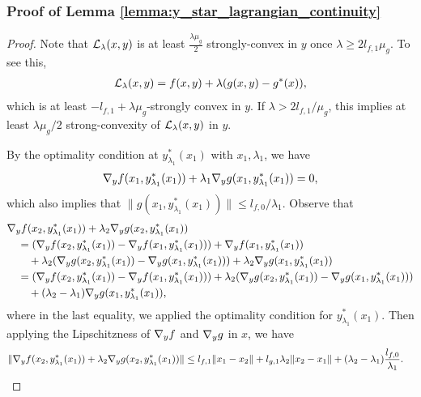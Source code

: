 \subsubsection{Proof of Lemma \ref{lemma:y_star_lagrangian_continuity}}
\begin{proof}
    Note that $\mathcal{L}_{\lambda}(x,y)$ is at least $\frac{\lambda\mu_g}{2}$ strongly-convex in $y$ once $\lambda \ge 2 l_{f,1} \mu_g$. To see this,
    \begin{align*}
        \mathcal{L}_{\lambda}(x,y) = f(x,y) + \lambda (g(x,y) - g^*(x)),
    \end{align*}
    which is at least $-l_{f,1} + \lambda \mu_g$-strongly convex in $y$. If $\lambda > 2l_{f,1} / \mu_g$, this implies at least $\lambda \mu_g / 2$ strong-convexity of $\mathcal{L}_{\lambda} (x,y)$ in $y$. 

    By the optimality condition at $y_{\lambda_1}^*(x_1)$ with $x_1, \lambda_1$, we have
    \begin{align*}
        \nabla_y f(x_1, y_{\lambda_1}^*(x_1) ) + \lambda_1 \nabla_y g(x_1, y_{\lambda_1}^*(x_1) ) = 0,
    \end{align*}
    which also implies that $\|g(x_1, y_{\lambda_1}^*(x_1) )\| \le l_{f,0} / \lambda_1$. Observe that
    \begin{align*}
        &\nabla_y f(x_2, y_{\lambda_1}^*(x_1)) + \lambda_2 \nabla_y g(x_2, y_{\lambda_1}^*(x_1)) \\
        &\quad = (\nabla_y f(x_2, y_{\lambda_1}^*(x_1)) - \nabla_y f(x_1, y_{\lambda_1}^*(x_1))) + \nabla_y f(x_1, y_{\lambda_1}^*(x_1)) \\
        &\qquad + \lambda_2 (\nabla_y g(x_2, y_{\lambda_1}^*(x_1)) - \nabla_y g(x_1, y_{\lambda_1}^*(x_1))) + \lambda_2 \nabla_y g(x_1, y_{\lambda_1}^*(x_1)) \\
        &\quad = (\nabla_y f(x_2, y_{\lambda_1}^*(x_1)) - \nabla_y f(x_1, y_{\lambda_1}^*(x_1))) + \lambda_2 (\nabla_y g(x_2, y_{\lambda_1}^*(x_1)) - \nabla_y g(x_1, y_{\lambda_1}^*(x_1))) \\
        &\qquad + (\lambda_2 - \lambda_1) \nabla_y g(x_1, y_{\lambda_1}^*(x_1)),
    \end{align*}
    where in the last equality, we applied the optimality condition for $y_{\lambda_1}^*(x_1)$. Then applying the Lipschitzness of $\nabla_y f$ and $\nabla_y g$ in $x$, we have
    \begin{align*}
        \|\grad_y f(x_2, y_{\lambda_1}^*(x_1)) + \lambda_2 \grad_y g(x_2, y_{\lambda_1}^*(x_1))\| &\le l_{f,1} \|x_1 - x_2\| + l_{g,1} \lambda_2 \|x_2 - x_1\| + (\lambda_2 - \lambda_1) \frac{l_{f,0}}{\lambda_1}. 

\end{align*}
\end{proof}
